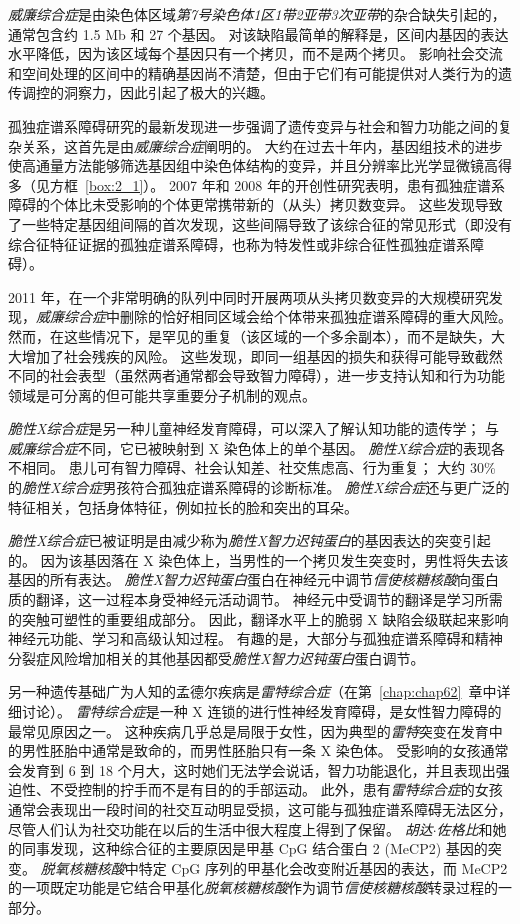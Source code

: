 \textit{威廉综合症}是由染色体区域\textit{第7号染色体1区1带2亚带3次亚带}的杂合缺失引起的，通常包含约 1.5 Mb 和 27 个基因。
对该缺陷最简单的解释是，区间内基因的表达水平降低，因为该区域每个基因只有一个拷贝，而不是两个拷贝。
影响社会交流和空间处理的区间中的精确基因尚不清楚，但由于它们有可能提供对人类行为的遗传调控的洞察力，因此引起了极大的兴趣。


孤独症谱系障碍研究的最新发现进一步强调了遗传变异与社会和智力功能之间的复杂关系，这首先是由\textit{威廉综合症}阐明的。
大约在过去十年内，基因组技术的进步使高通量方法能够筛选基因组中染色体结构的变异，并且分辨率比光学显微镜高得多（见方框~\ref{box:2_1}）。
2007 年和 2008 年的开创性研究表明，患有孤独症谱系障碍的个体比未受影响的个体更常携带新的（从头）拷贝数变异。
这些发现导致了一些特定基因组间隔的首次发现，这些间隔导致了该综合征的常见形式（即没有综合征特征证据的孤独症谱系障碍，也称为特发性或非综合征性孤独症谱系障碍）。


2011 年，在一个非常明确的队列中同时开展两项从头拷贝数变异的大规模研究发现，\textit{威廉综合症}中删除的恰好相同区域会给个体带来孤独症谱系障碍的重大风险。
然而，在这些情况下，是罕见的重复（该区域的一个多余副本），而不是缺失，大大增加了社会残疾的风险。
这些发现，即同一组基因的损失和获得可能导致截然不同的社会表型（虽然两者通常都会导致智力障碍），进一步支持认知和行为功能领域是可分离的但可能共享重要分子机制的观点。


\textit{脆性X综合症}是另一种儿童神经发育障碍，可以深入了解认知功能的遗传学；
与\textit{威廉综合症}不同，它已被映射到 X 染色体上的单个基因。
\textit{脆性X综合症}的表现各不相同。
患儿可有智力障碍、社会认知差、社交焦虑高、行为重复；
大约 30\% 的\textit{脆性X综合症}男孩符合孤独症谱系障碍的诊断标准。
\textit{脆性X综合症}还与更广泛的特征相关，包括身体特征，例如拉长的脸和突出的耳朵。


\textit{脆性X综合症}已被证明是由减少称为\textit{脆性X智力迟钝蛋白}的基因表达的突变引起的。
因为该基因落在 X 染色体上，当男性的一个拷贝发生突变时，男性将失去该基因的所有表达。
\textit{脆性X智力迟钝蛋白}蛋白在神经元中调节\textit{信使核糖核酸}向蛋白质的翻译，这一过程本身受神经元活动调节。
神经元中受调节的翻译是学习所需的突触可塑性的重要组成部分。
因此，翻译水平上的脆弱 X 缺陷会级联起来影响神经元功能、学习和高级认知过程。
有趣的是，大部分与孤独症谱系障碍和精神分裂症风险增加相关的其他基因都受\textit{脆性X智力迟钝蛋白}蛋白调节。


另一种遗传基础广为人知的孟德尔疾病是\textit{雷特综合症}（在第~\ref{chap:chap62}~章中详细讨论）。
\textit{雷特综合症}是一种 X 连锁的进行性神经发育障碍，是女性智力障碍的最常见原因之一。
这种疾病几乎总是局限于女性，因为典型的\textit{雷特}突变在发育中的男性胚胎中通常是致命的，而男性胚胎只有一条 X 染色体。
受影响的女孩通常会发育到 6 到 18 个月大，这时她们无法学会说话，智力功能退化，并且表现出强迫性、不受控制的拧手而不是有目的的手部运动。
此外，患有\textit{雷特综合症}的女孩通常会表现出一段时间的社交互动明显受损，这可能与孤独症谱系障碍无法区分，尽管人们认为社交功能在以后的生活中很大程度上得到了保留。
\textit{胡达$\cdot$佐格比}和她的同事发现，这种综合征的主要原因是甲基 CpG 结合蛋白 2 (MeCP2) 基因的突变。
\textit{脱氧核糖核酸}中特定 CpG 序列的甲基化会改变附近基因的表达，而 MeCP2 的一项既定功能是它结合甲基化\textit{脱氧核糖核酸}作为调节\textit{信使核糖核酸}转录过程的一部分。


